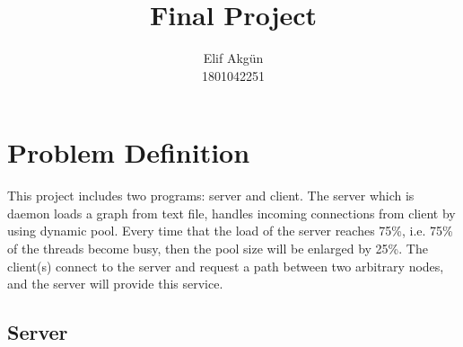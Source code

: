 \documentclass[twoside,11pt]{article}
\newcommand\studentName{Elif Akgün}                  %
\newcommand\studentNumber{1801042251}                %
\begin{document}
    
    \title{Final Project \assignmentNumber}
    
    \author{\name \studentName \email \studentEmail \\
    \studentNumber
    \addr
    }
    
    \maketitle

\section{Problem Definition} 
\label{sec:background}

This project includes two programs: server and client. The server which is daemon loads a graph from text file, handles incoming connections from client by using dynamic pool. Every time that the load of the server reaches 75\%, i.e. 75\% of the threads become busy, then the pool size will be enlarged by 25\%. The client(s) connect to the server and request a path between two arbitrary nodes, and the server will provide this service.\newline

\subsection{Server}
\end{document}
